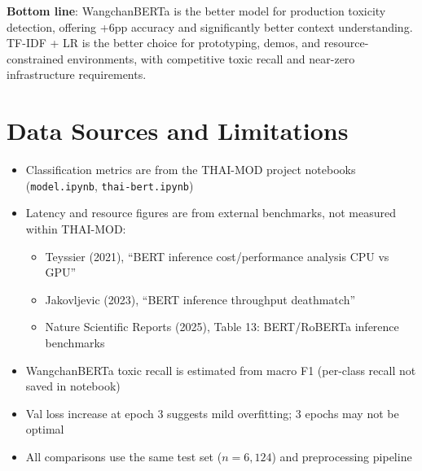 \documentclass[11pt,a4paper]{article}
\begin{document}
\textbf{Bottom line}: WangchanBERTa is the better model for production toxicity detection,
offering +6pp accuracy and significantly better context understanding. TF-IDF + LR is the
better choice for prototyping, demos, and resource-constrained environments, with competitive
toxic recall and near-zero infrastructure requirements.

\section*{Data Sources and Limitations}

\begin{itemize}[nosep]
    \item Classification metrics are from the THAI-MOD project notebooks (\texttt{model.ipynb}, \texttt{thai-bert.ipynb})
    \item Latency and resource figures are from external benchmarks, not measured within THAI-MOD:
    \begin{itemize}[nosep]
        \item Teyssier (2021), ``BERT inference cost/performance analysis CPU vs GPU''
        \item Jakovljevic (2023), ``BERT inference throughput deathmatch''
        \item Nature Scientific Reports (2025), Table 13: BERT/RoBERTa inference benchmarks
    \end{itemize}
    \item WangchanBERTa toxic recall is estimated from macro F1 (per-class recall not saved in notebook)
    \item Val loss increase at epoch 3 suggests mild overfitting; 3 epochs may not be optimal
    \item All comparisons use the same test set ($n = 6{,}124$) and preprocessing pipeline
\end{itemize}
\end{document}
